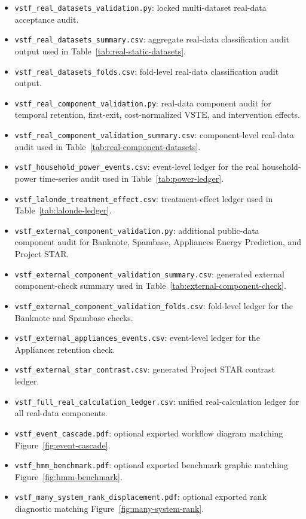 \documentclass[11pt,a4paper]{article}
\newcommand{\VSTE}{\ensuremath{\mathrm{VSTE}}}
\newcommand{\1}{\mathbf{1}}
\begin{document}
\begin{itemize}
  \item \texttt{vstf\_real\_datasets\_validation.py}: locked multi-dataset real-data acceptance audit.
  \item \texttt{vstf\_real\_datasets\_summary.csv}: aggregate real-data classification audit output used in Table~\ref{tab:real-static-datasets}.
  \item \texttt{vstf\_real\_datasets\_folds.csv}: fold-level real-data classification audit output.
  \item \texttt{vstf\_real\_component\_validation.py}: real-data component audit for temporal retention, first-exit, cost-normalized \VSTE{}, and intervention effects.
  \item \texttt{vstf\_real\_component\_validation\_summary.csv}: component-level real-data audit used in Table~\ref{tab:real-component-datasets}.
  \item \texttt{vstf\_household\_power\_events.csv}: event-level ledger for the real household-power time-series audit used in Table~\ref{tab:power-ledger}.
  \item \texttt{vstf\_lalonde\_treatment\_effect.csv}: treatment-effect ledger used in Table~\ref{tab:lalonde-ledger}.
  \item \texttt{vstf\_external\_component\_validation.py}: additional public-data component audit for Banknote, Spambase, Appliances Energy Prediction, and Project STAR.
  \item \texttt{vstf\_external\_component\_validation\_summary.csv}: generated external component-check summary used in Table~\ref{tab:external-component-check}.
  \item \texttt{vstf\_external\_component\_validation\_folds.csv}: fold-level ledger for the Banknote and Spambase checks.
  \item \texttt{vstf\_external\_appliances\_events.csv}: event-level ledger for the Appliances retention check.
  \item \texttt{vstf\_external\_star\_contrast.csv}: generated Project STAR contrast ledger.
  \item \texttt{vstf\_full\_real\_calculation\_ledger.csv}: unified real-calculation ledger for all real-data components.
  \item \texttt{vstf\_event\_cascade.pdf}: optional exported workflow diagram matching Figure~\ref{fig:event-cascade}.
  \item \texttt{vstf\_hmm\_benchmark.pdf}: optional exported benchmark graphic matching Figure~\ref{fig:hmm-benchmark}.
  \item \texttt{vstf\_many\_system\_rank\_displacement.pdf}: optional exported rank diagnostic matching Figure~\ref{fig:many-system-rank}.

\end{itemize}
\end{document}
